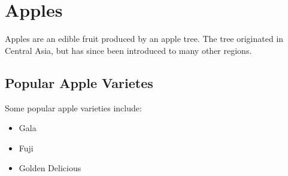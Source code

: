 \documentclass{article}
\begin{document}
	
\section{Apples}
Apples are an edible fruit produced by an apple tree. The tree originated in Central Asia, but has since been introduced to many other regions.

\subsection{Popular Apple Varietes}

Some popular apple varieties include:

\begin{itemize}
	\item Gala
	\item Fuji
	\item Golden Delicious
\end{itemize}
	
\end{document}
